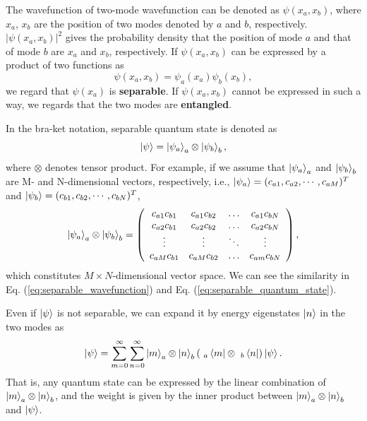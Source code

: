 The wavefunction of two-mode wavefunction can be denoted as $\psi(x_a, x_b)$, where $x_a$, $x_b$ are the position of two modes denoted by $a$ and $b$, respectively. $|\psi(x_a,x_b)|^2$ gives the probability density that the position of mode $a$ and that of mode $b$ are $x_a$ and $x_b$, respectively. If $\psi(x_a, x_b)$ can be expressed by a product of two functions as
\begin{equation}
  \psi(x_a, x_b) = \psi_a(x_a)\psi_b(x_b),
  \label{eq:separable_wavefunction}
\end{equation}
we regard that $\psi(x_a)$ is \textbf{separable}. If $\psi(x_a, x_b)$ cannot be expressed in such a way, we regards that the two modes are \textbf{entangled}.

In the bra-ket notation, separable quantum state is denoted as
\begin{equation}
  \ket \psi = \ket {\psi_a}_a \otimes \ket{\psi_b}_b,
\end{equation}
where $\otimes$ denotes tensor product. For example, if we assume that $\ket {\psi_a}_a$ and $\ket{\psi_b}_b$ are M- and N-dimensional vectors, respectively, i.e., $\ket {\psi_a} = (c_{a1}, c_{a2}, \cdots, c_{aM})^T$ and $\ket {\psi_b} = (c_{b1}, c_{b2}, \cdots, c_{bN})^T$,
\begin{equation}
  \ket{\psi_a}_a \otimes \ket{\psi_b}_b = \left(
  \begin{array}{cccc}
  c_{a1}c_{b1} & c_{a1}c_{b2} & \ldots & c_{a1}c_{bN}\\
  c_{a2}c_{b1} & c_{a2}c_{b2} & \ldots & c_{a2}c_{bN}\\
  \vdots & \vdots & \ddots & \vdots \\
  c_{aM}c_{b1} & c_{aM}c_{b2} & \ldots & c_{am}c_{bN}
  \end{array}
  \right),
  \label{eq:separable_quantum_state}
\end{equation}
which constitutes $M \times N$-dimensional vector space. We can see the similarity in Eq. (\ref{eq:separable_wavefunction}) and Eq. (\ref{eq:separable_quantum_state}).

Even if $\ket \psi$ is not separable, we can expand it by energy eigenstates $\ket n$ in the two modes as
\begin{equation}
  \ket \psi = \sum_{m=0}^{\infty}\sum_{n=0}^{\infty}\ket m_a \otimes \ket n_b (\ _a\bra m  \otimes \ _b\bra n)\ket \psi. 
\end{equation}
That is, any quantum state can be expressed by the linear combination of $\ket m_a \otimes \ket n_b$, and the weight is given by the inner product between $\ket m_a \otimes \ket n_b$ and $\ket \psi$.

